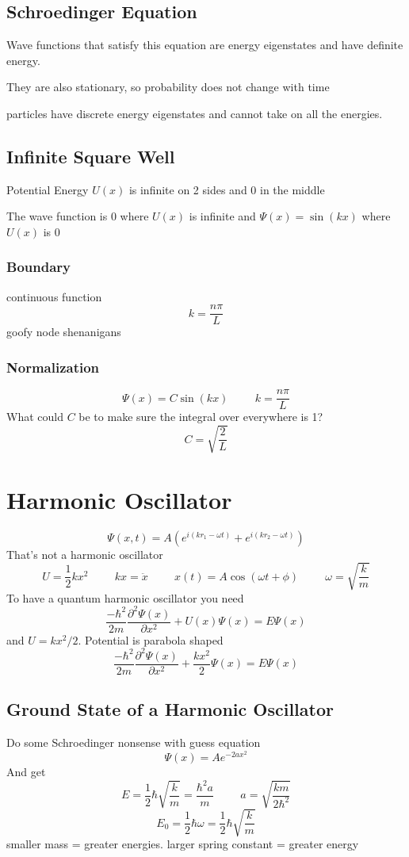\documentclass[fleqn]{report}
\newcommand{\hp}{\hspace{1cm}}
\newcommand{\pdif}[2]{ \frac{\partial #1}{ \partial #2} }
\begin{document}
\section{Schroedinger Equation}
Wave functions that satisfy this equation are energy eigenstates and have definite energy.

They are also stationary, so probability does not change with time

particles have discrete energy eigenstates and cannot take on all the energies.

\section{Infinite Square Well}
Potential Energy $U(x)$ is infinite on 2 sides and 0 in the middle

The wave function is 0 where $U(x)$ is infinite and $\Psi (x) = \sin(kx)$ where $U(x)$ is 0

\subsection{Boundary}
continuous function 
\[
k = \frac{n \pi}{L}
\]
goofy node shenanigans

\subsection{Normalization}
\[
\Psi(x) = C \sin (kx) 
\hp
k = \frac{n \pi}{L}
\]
What could $C$ be to make sure the integral over everywhere is 1?
\[
C = \sqrt{\frac{2}{L}}
\]


\chapter{Harmonic Oscillator}
\[
\Psi(x, t) = A(e^{i(kr_1 - \omega t)} + e^{i(kr_2 - \omega t)})
\]
That's not a harmonic oscillator
\[
U = \frac{1}{2} k x^2
\hp
kx = \ddot{x}
\hp
x(t) = A \cos (\omega t + \phi)
\hp
\omega = \sqrt{\frac{k}{m}}
\]
To have a quantum harmonic oscillator you need
\[
\frac{-\hbar^2}{2m} \pdif{^2 \Psi(x)}{x^2} + U(x) \Psi (x) = E \Psi (x)
\]
and $U = kx^2/2$. Potential is parabola shaped 
\[
\frac{-\hbar^2}{2m} \pdif{^2 \Psi(x)}{x^2} + \frac{kx^2}{2} \Psi (x) = E \Psi (x)
\]

\section{Ground State of a Harmonic Oscillator}
Do some Schroedinger nonsense with guess equation
\[
\Psi (x) = Ae^{-2ax^2}
\]
And get
\[
E = \frac{1}{2} \hbar \sqrt{ \frac{k}{m}}
=
\frac{ \hbar^2 a}{m}
\hp
a = \sqrt{ \frac{km}{2 \hbar^2}}
\]
\[
E_0 = \frac{1}{2} \hbar \omega = \frac{1}{2} \hbar \sqrt{ \frac{k}{m}}
\]
smaller mass = greater energies. larger spring constant = greater energy
\end{document}

